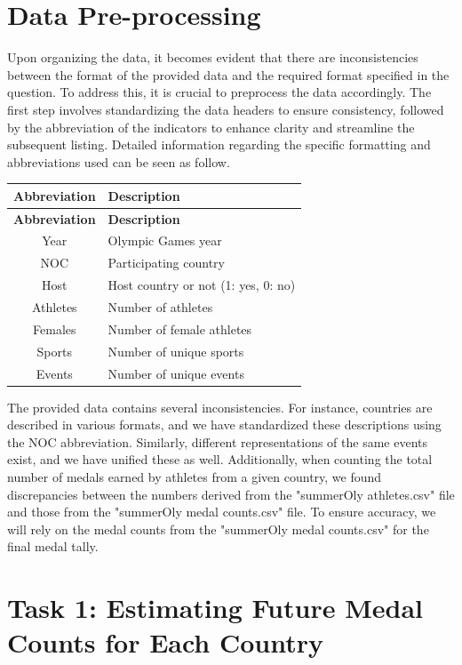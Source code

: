\documentclass[12pt]{article}  %
\begin{document}
\section{Data Pre-processing}
Upon organizing the data, it becomes evident that there are inconsistencies between the format of the provided data and the required format specified in the question. To address this, it is crucial to preprocess the data accordingly. The first step involves standardizing the data headers to ensure consistency, followed by the abbreviation of the indicators to enhance clarity and streamline the subsequent listing. Detailed information regarding the specific formatting and abbreviations used can be seen as follow.
\begin{longtable}{|c|l|}
\hline
\textbf{Abbreviation} & \textbf{Description} \\
\hline
\endfirsthead
\hline
\textbf{Abbreviation} & \textbf{Description} \\
\hline
\endhead
\hline
\endfoot

Year & Olympic Games year \\
NOC & Participating country \\
Host & Host country or not (1: yes, 0: no) \\
Athletes & Number of athletes \\
Females & Number of female athletes \\
Sports & Number of unique sports \\
Events & Number of unique events \\
\end{longtable}

The provided data contains several inconsistencies. For instance, countries are described in various formats, and we have standardized these descriptions using the NOC abbreviation. Similarly, different representations of the same events exist, and we have unified these as well. Additionally, when counting the total number of medals earned by athletes from a given country, we found discrepancies between the numbers derived from the "summerOly athletes.csv" file and those from the "summerOly medal counts.csv" file. To ensure accuracy, we will rely on the medal counts from the "summerOly medal counts.csv" for the final medal tally.
\section{Task 1: Estimating Future Medal Counts for Each Country}
\end{document}
